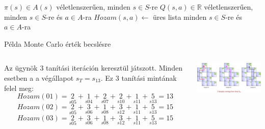 \documentclass[english, aspectratio=169]{beamer}
\begin{document}
\begin{frame}{}
\begin{algorithm}[H]
\caption{Monte Carlo becslés az $\pi_{*}$ megkeresésére}
\SetAlgoLined
\begin{small}
$\pi(s) \in A(s)$ véletlenszerűen, minden $s \in S$-re\;
$Q(s,a) \in \mathbb{R}$ véletlenszerűen, minden $s \in S$-re és $a \in A$-ra\;
$Hozam(s,a) \leftarrow$ üres lista minden $s \in S$-re és $a \in A$-ra\;
\end{small}
\end{algorithm}
\end{frame}

\begin{frame}{Példa Monte Carlo érték becslésre}
\begin{columns} %
\begin{column}{.5\textwidth}
Az ügynök 3 tanítási iteráción keresztül játszott. Minden esetben a a végállapot $s_T=s_{13}$. Ez 3 tanítási mintának felel meg:
\[
Hozam(01) = \underset{s05}{2}+\underset{s04}{1}+\underset{s07}{2}+\underset{s10}{2}+\underset{s11}{1}+\underset{s13}{5}=13
\]
\[
Hozam(02) = \underset{s05}{2}+\underset{s06}{3}+\underset{s08}{1}+\underset{s12}{3}+\underset{s11}{1}+\underset{s13}{5}=15
\]
\[
Hozam(03) = \underset{s05}{2}+\underset{s06}{3}+\underset{s08}{1}+\underset{s12}{3}+\underset{s11}{1}+\underset{s13}{5}=15
\]
\end{column}
\begin{column}{.5\textwidth}
\begin{center}
\includegraphics[width=7cm, keepaspectratio]{images/mc_td_12.png}
\end{center}
\end{column}
\end{columns}
\end{frame}
\end{document}
